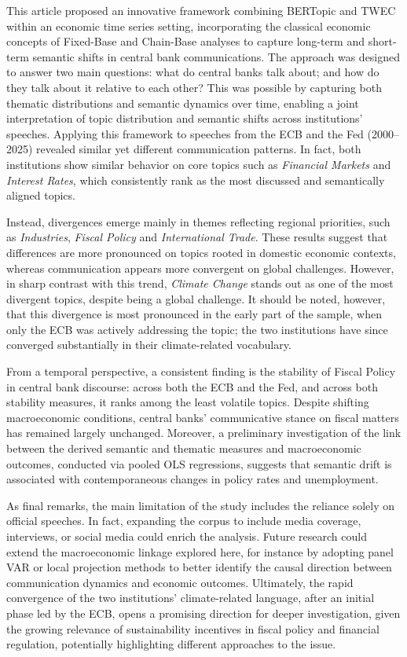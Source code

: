 This article proposed an innovative framework combining BERTopic and TWEC within an economic time series setting, incorporating the classical economic concepts of Fixed-Base and Chain-Base analyses to capture long-term and short-term semantic shifts in central bank communications. The approach was designed to answer two main questions: what do central banks talk about; and how do they talk about it relative to each other? This was possible by capturing both thematic distributions and semantic dynamics over time, enabling a joint interpretation of topic distribution and semantic shifts across institutions' speeches. Applying this framework to speeches from the ECB and the Fed (2000–2025) revealed similar yet different communication patterns. In fact, both institutions show similar behavior on core topics such as \textit{Financial Markets} and \textit{Interest Rates}, which consistently rank as the most discussed and semantically aligned topics.

Instead, divergences emerge mainly in themes reflecting regional priorities, such as \textit{Industries}, \textit{Fiscal Policy} and \textit{International Trade}. These results suggest that differences are more pronounced on topics rooted in domestic economic contexts, whereas communication appears more convergent on global challenges. However, in sharp contrast with this trend, \textit{Climate Change} stands out as one of the most divergent topics, despite being a global challenge. It should be noted, however, that this divergence is most pronounced in the early part of the sample, when only the ECB was actively addressing the topic; the two institutions have since converged substantially in their climate-related vocabulary.

From a temporal perspective, a consistent finding is the stability of Fiscal Policy in central bank discourse: across both the ECB and the Fed, and across both stability measures, it ranks among the least volatile topics. Despite shifting macroeconomic conditions, central banks' communicative stance on fiscal matters has remained largely unchanged. Moreover, a preliminary investigation of the link between the derived semantic and thematic measures and macroeconomic outcomes, conducted via pooled OLS regressions, suggests that semantic drift is associated with contemporaneous changes in policy rates and unemployment.

As final remarks, the main limitation of the study includes the reliance solely on official speeches. In fact, expanding the corpus to include media coverage, interviews, or social media could enrich the analysis. Future research could extend the macroeconomic linkage explored here, for instance by adopting panel VAR or local projection methods to better identify the causal direction between communication dynamics and economic outcomes. Ultimately, the rapid convergence of the two institutions' climate-related language, after an initial phase led by the ECB, opens a promising direction for deeper investigation, given the growing relevance of sustainability incentives in fiscal policy and financial regulation, potentially highlighting different approaches to the issue.

